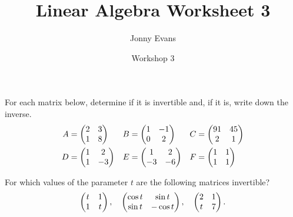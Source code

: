 \documentclass{article}
\title{Linear Algebra Worksheet 3}
\author{Jonny Evans}
\date{Workshop 3}
\begin{document}
\maketitle
\setcounter{section}{1}


\begin{Exercise}\label{exr:inv2}
For each matrix below, determine if it is invertible and, if it is,
write down the inverse.
\begin{align*}
A&=\begin{pmatrix} 2 & 3 \\ 1 & 8\end{pmatrix} & B&=\begin{pmatrix} 1 & -1 \\ 0 & 2\end{pmatrix} & C&=\begin{pmatrix} 91 & 45 \\ 2 & 1\end{pmatrix}\\
D&=\begin{pmatrix} 1 & 2 \\ 1 & -3 \end{pmatrix} & E&=\begin{pmatrix} 1 & 2 \\ -3 & -6\end{pmatrix} & F&=\begin{pmatrix} 1 & 1 \\ 1 & 1\end{pmatrix}
\end{align*}


\end{Exercise}
\begin{Exercise}
For which values of the parameter \(t\) are the following matrices
invertible? \[\begin{pmatrix} t & 1 \\ 1 & t\end{pmatrix},\quad\begin{pmatrix} \cos t & \sin t
\\ \sin t & -\cos t\end{pmatrix},\quad \begin{pmatrix} 2 & 1 \\ t & 7\end{pmatrix}.\]


\end{Exercise}
\end{document}
